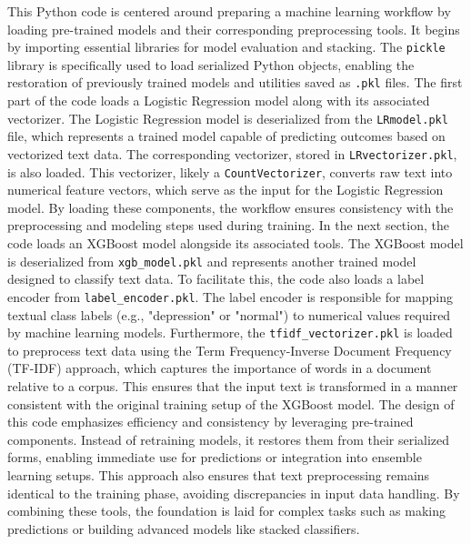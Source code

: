 \noindent
This Python code is centered around preparing a machine learning workflow by loading pre-trained models and their corresponding preprocessing tools. It begins by importing essential libraries for model evaluation and stacking. The \texttt{pickle} library is specifically used to load serialized Python objects, enabling the restoration of previously trained models and utilities saved as \texttt{.pkl} files. The first part of the code loads a Logistic Regression model along with its associated vectorizer. The Logistic Regression model is deserialized from the \texttt{LRmodel.pkl} file, which represents a trained model capable of predicting outcomes based on vectorized text data. The corresponding vectorizer, stored in \texttt{LRvectorizer.pkl}, is also loaded. This vectorizer, likely a \texttt{CountVectorizer}, converts raw text into numerical feature vectors, which serve as the input for the Logistic Regression model. By loading these components, the workflow ensures consistency with the preprocessing and modeling steps used during training. In the next section, the code loads an XGBoost model alongside its associated tools. The XGBoost model is deserialized from \texttt{xgb\_model.pkl} and represents another trained model designed to classify text data. To facilitate this, the code also loads a label encoder from \texttt{label\_encoder.pkl}. The label encoder is responsible for mapping textual class labels (e.g., "depression" or "normal") to numerical values required by machine learning models. Furthermore, the \texttt{tfidf\_vectorizer.pkl} is loaded to preprocess text data using the Term Frequency-Inverse Document Frequency (TF-IDF) approach, which captures the importance of words in a document relative to a corpus. This ensures that the input text is transformed in a manner consistent with the original training setup of the XGBoost model. The design of this code emphasizes efficiency and consistency by leveraging pre-trained components. Instead of retraining models, it restores them from their serialized forms, enabling immediate use for predictions or integration into ensemble learning setups. This approach also ensures that text preprocessing remains identical to the training phase, avoiding discrepancies in input data handling. By combining these tools, the foundation is laid for complex tasks such as making predictions or building advanced models like stacked classifiers.

